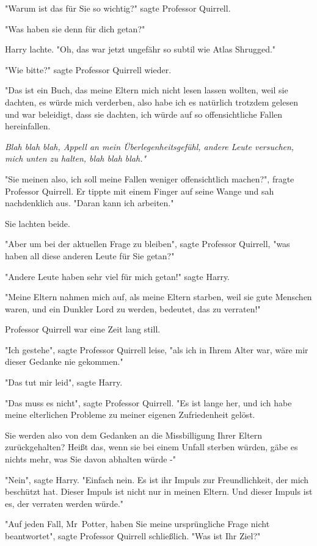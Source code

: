 {"Warum ist das für Sie so wichtig?" sagte Professor Quirrell.

"Was haben sie denn für dich getan?"

Harry lachte. "Oh, das war jetzt ungefähr so subtil wie Atlas Shrugged."

"Wie bitte?" sagte Professor Quirrell wieder.

"Das ist ein Buch, das meine Eltern mich nicht lesen lassen wollten, weil sie dachten, es würde mich verderben, also habe ich es natürlich trotzdem gelesen und war beleidigt, dass sie dachten, ich würde auf so offensichtliche Fallen hereinfallen.

\emph{Blah blah blah, Appell an mein Überlegenheitsgefühl, andere Leute versuchen, mich unten zu halten, blah blah blah."}

"Sie meinen also, ich soll meine Fallen weniger offensichtlich machen?", fragte Professor Quirrell. Er tippte mit einem Finger auf seine Wange und sah nachdenklich aus. "Daran kann ich arbeiten."

Sie lachten beide.

"Aber um bei der aktuellen Frage zu bleiben", sagte Professor Quirrell, "was haben all diese anderen Leute für Sie getan?"

"Andere Leute haben sehr viel für mich getan!" sagte Harry.

"Meine Eltern nahmen mich auf, als meine Eltern starben, weil sie gute Menschen waren, und ein Dunkler Lord zu werden, bedeutet, das zu verraten!"

Professor Quirrell war eine Zeit lang still.

"Ich gestehe", sagte Professor Quirrell leise, "als ich in Ihrem Alter war, wäre mir dieser Gedanke nie gekommen."

"Das tut mir leid", sagte Harry.

"Das muss es nicht", sagte Professor Quirrell. "Es ist lange her, und ich habe meine elterlichen Probleme zu meiner eigenen Zufriedenheit gelöst.

Sie werden also von dem Gedanken an die Missbilligung Ihrer Eltern zurückgehalten? Heißt das, wenn sie bei einem Unfall sterben würden, gäbe es nichts mehr, was Sie davon abhalten würde -"

"Nein", sagte Harry. "Einfach nein. Es ist ihr Impuls zur Freundlichkeit, der mich beschützt hat. Dieser Impuls ist nicht nur in meinen Eltern. Und dieser Impuls ist es, der verraten werden würde."

"Auf jeden Fall, Mr~Potter, haben Sie meine ursprüngliche Frage nicht beantwortet", sagte Professor Quirrell schließlich. "Was ist Ihr Ziel?"

}
